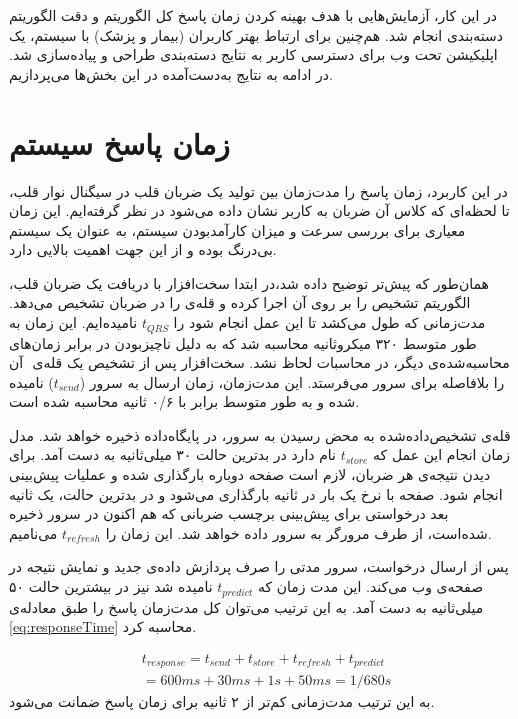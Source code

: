 
\label{chap:result}
\pagebreak

در این کار، آزمایش‌هایی با هدف بهینه کردن زمان پاسخ کل الگوریتم و دقت الگوریتم دسته‌بندی انجام شد. هم‌چنین برای ارتباط بهتر کاربران (بیمار و پزشک) با سیستم، یک اپلیکیشن تحت وب برای دسترسی کاربر به نتایج دسته‌بندی طراحی و پیاده‌سازی شد. در ادامه به نتایج به‌دست‌آمده در این بخش‌ها می‌پردازیم.

\section{زمان پاسخ سیستم}
در این کاربرد، زمان پاسخ را مدت‌زمان بین تولید یک ضربان قلب در سیگنال نوار قلب، تا لحظه‌ای که کلاس آن ضربان به کاربر نشان داده می‌شود در نظر گرفته‌ایم. این زمان معیاری برای بررسی سرعت و میزان کارآمدبودن سیستم، به عنوان یک سیستم بی‌درنگ بوده و از این جهت اهمیت بالایی دارد. 

همان‌طور که پیش‌تر توضیح داده شد،در ابتدا سخت‌افزار با دریافت یک ضربان قلب، الگوریتم تشخیص  را بر روی آن اجرا کرده و قله‌ی  را در ضربان تشخیص می‌دهد. مدت‌زمانی که طول می‌کشد تا این عمل انجام شود را $t_{QRS}$ نامیده‌ایم. این زمان به طور متوسط ۳۲۰ میکروثانیه محاسبه شد که به دلیل ناچیزبودن در برابر زمان‌های محاسبه‌شده‌ی دیگر، در محاسبات لحاظ نشد. سخت‌افزار پس از تشخیص یک قله‌ی ‌ آن را بلافاصله برای سرور می‌فرستد. این مدت‌زمان، زمان ارسال به سرور ($t_{send}$) نامیده شده و به طور متوسط برابر با ۰/۶ ثانیه محاسبه شده است.

قله‌ی  تشخیص‌داده‌شده به محض رسیدن به سرور، در پایگاه‌داده ذخیره خواهد شد. مدل زمان انجام این عمل که $t_{store}$ نام دارد در  بدترین حالت ۳۰ میلی‌ثانیه به دست آمد. برای دیدن نتیجه‌ی هر ضربان، لازم است صفحه دوباره بارگذاری شده و عملیات پیش‌بینی انجام شود. صفحه با نرخ یک بار در ثانیه بارگذاری می‌شود و در بدترین حالت، یک ثانیه بعد درخواستی برای پیش‌بینی برچسب ضربانی که هم اکنون در سرور ذخیره شده‌است، از طرف مرورگر به سرور داده خواهد شد. این زمان را $t_{refresh}$ می‌نامیم.

پس از ارسال درخواست، سرور مدتی را صرف پردازش داده‌ی جدید و نمایش نتیجه در صفحه‌ی وب می‌کند. این مدت زمان که $t_{predict}$ نامیده شد نیز در بیشترین حالت ۵۰ میلی‌ثانیه به دست آمد. به این ترتیب می‌توان کل مدت‌زمان پاسخ را طبق معادله‌ی \ref{eq:responseTime} محاسبه کرد.

\begin{equation}
\begin{split}
	& t_{response} = t_{send} + t_{store} + t_{refresh} + t_{predict} \\
	& = 600 ms + 30 ms + 1 s + 50 ms = 1/680 s
\end{split}
\label{eq:responseTime}
\end{equation}
به این ترتیب مدت‌زمانی کم‌تر از ۲ ثانیه برای زمان پاسخ ضمانت می‌شود.
 
